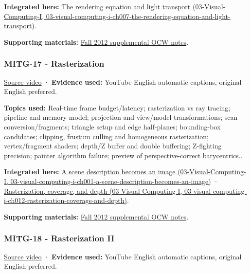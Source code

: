 \textbf{Integrated here:} \href{../03-Visual-Computing-I/main.pdf\#nameddest=03-visual-computing-i-ch007-the-rendering-equation-and-light-transport}{The rendering equation and light transport (03-Visual-Computing-I, 03-visual-computing-i-ch007-the-rendering-equation-and-light-transport)}.

\textbf{Supporting materials:} \href{https://ocw.mit.edu/courses/6-837-computer-graphics-fall-2012/pages/lecture-notes/}{Fall 2012 supplemental OCW notes}.

\subsubsection{MITG-17 - Rasterization}\label{04-visual-computing-ii-ch036-mitg-17---rasterization}

\href{https://www.youtube.com/watch?v=aCTEiX59ERM}{Source video} · \textbf{Evidence used:} YouTube English automatic captions, original English preferred.

\textbf{Topics used:} Real-time frame budget/latency; rasterization vs ray tracing; pipeline and memory model; projection and view/model transformations; scan conversion/fragments; triangle setup and edge half-planes; bounding-box candidates; clipping, frustum culling and homogeneous rasterization; vertex/fragment shaders; depth/Z buffer and double buffering; Z-fighting precision; painter algorithm failure; preview of perspective-correct barycentrics..

\textbf{Integrated here:} \href{../03-Visual-Computing-I/main.pdf\#nameddest=03-visual-computing-i-ch001-a-scene-description-becomes-an-image}{A scene description becomes an image (03-Visual-Computing-I, 03-visual-computing-i-ch001-a-scene-description-becomes-an-image)} · \href{../03-Visual-Computing-I/main.pdf\#nameddest=03-visual-computing-i-ch012-rasterization-coverage-and-depth}{Rasterization, coverage, and depth (03-Visual-Computing-I, 03-visual-computing-i-ch012-rasterization-coverage-and-depth)}.

\textbf{Supporting materials:} \href{https://ocw.mit.edu/courses/6-837-computer-graphics-fall-2012/pages/lecture-notes/}{Fall 2012 supplemental OCW notes}.

\subsubsection{MITG-18 - Rasterization II}\label{04-visual-computing-ii-ch036-mitg-18---rasterization-ii}

\href{https://www.youtube.com/watch?v=bZAu7QtyYvo}{Source video} · \textbf{Evidence used:} YouTube English automatic captions, original English preferred.

